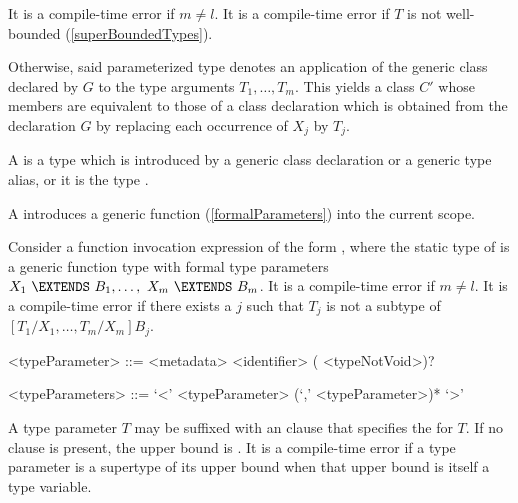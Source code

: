 \documentclass[makeidx]{article}
\begin{document}
\LMHash{}%
It is a compile-time error if $m \not= l$.
It is a compile-time error if $T$ is not well-bounded
(\ref{superBoundedTypes}).

\LMHash{}%
Otherwise, said parameterized type  denotes
an application of the generic class declared by $G$ to the type arguments
$T_1, \ldots, T_m$.
This yields a class $C'$ whose members are equivalent to those of
a class declaration which is obtained from the declaration $G$ by replacing
each occurrence of $X_j$ by $T_j$.



\LMHash{}%
A  is a type which is introduced by
a generic class declaration or a generic type alias,
or it is the type .

\LMHash{}%
A 
introduces a generic function (\ref{formalParameters}) into the current scope.

\LMHash{}%
Consider a function invocation expression of the form
,
where the static type of  is a generic function type
with formal type parameters
$X_1\ \EXTENDS\ B_1, \ldots,\ X_m\ \EXTENDS\ B_m$.
It is a compile-time error if $m \not= l$.
It is a compile-time error if there exists a $j$
such that $T_j$ is not a subtype of $[T_1/X_1, \ldots, T_m/X_m]B_j$.


\begin{grammar}
<typeParameter> ::= <metadata> <identifier> (\EXTENDS{} <typeNotVoid>)?

<typeParameters> ::= `<' <typeParameter> (`,' <typeParameter>)* `>'
\end{grammar}

\LMHash{}%
A type parameter $T$ may be suffixed with an \EXTENDS{} clause
that specifies the  for $T$.
If no \EXTENDS{} clause is present, the upper bound is .
It is a compile-time error if a type parameter is a supertype of its upper bound
when that upper bound is itself a type variable.
\end{document}
